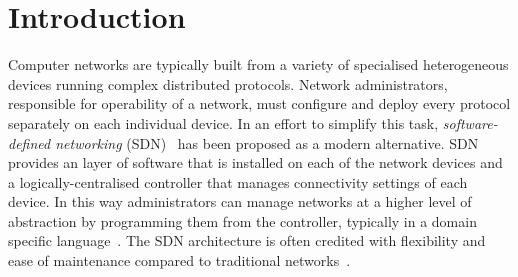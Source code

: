 

\newcommand{\souffle}{Souffl\'{e}\xspace}
\newcommand{\vampire}{Vampire\xspace}
\newcommand{\eprover}{E\xspace}
\newcommand{\spass}{Spass\xspace}


\newcommand{\Datalog}{Datalog\xspace}

\newcommand*{\rl}{\mathrel{\leftarrow}}
\newcommand*{\comma}{\mathrel{\wedge}}

\renewcommand*{\phi}{\varphi}

\newcommand{\typedRel}[1]{\mathit{#1}}
\newcommand{\typed}[2]{\typedRel{#1}({#2})}

\newcommand{\pred}[1]{\mathit{#1}} %
\newcommand{\const}[1]{\mathit{#1}} %
\newcommand{\type}[1]{\mathit{#1}} %

\newcommand{\sem}[1]{(#1)} %

\section{Introduction}
\label{sect:aws/introduction}
Computer networks are typically built from a variety of specialised heterogeneous devices running complex distributed protocols. Network administrators, responsible for operability of a network, must configure and deploy every protocol separately on each individual device. In an effort to simplify this task, \emph{software-defined networking} (SDN)~\cite{SDN} has been proposed as a modern alternative. SDN provides an layer of software that is installed on each of the network devices and a logically-centralised controller that manages connectivity settings of each device. In this way administrators can manage networks at a higher level of abstraction by programming them from the controller, typically in a domain specific language~\cite{DBLP:journals/cm/FosterGRSFKMRRSWH13}. The SDN architecture is often credited with flexibility and ease of maintenance compared to traditional networks~\cite{benzekki2016software}.

